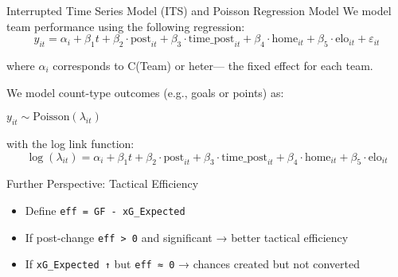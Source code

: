 \documentclass[
  ignorenonframetext,
]{beamer}
\providecommand{\tightlist}{%
  \setlength{\itemsep}{0pt}\setlength{\parskip}{0pt}}\usepackage{longtable,booktabs,array}
\begin{document}
\begin{frame}{Interrupted Time Series Model (ITS) and Poisson Regression
Model}
\label{interrupted-time-series-model-its-and-poisson-regression-model}
We model team performance using the following regression: \[
y_{it} = \alpha_i + \beta_1 t + \beta_2 \cdot \text{post}_{it} + \beta_3 \cdot \text{time\_post}_{it} + \beta_4 \cdot \text{home}_{it} + \beta_5 \cdot \text{elo}_{it} + \varepsilon_{it}
\]

where \(\alpha_i\) corresponds to C(Team) or heter--- the fixed effect
for each team.

We model count-type outcomes (e.g., goals or points) as:

\(y_{it} \sim \text{Poisson}(\lambda_{it})\)

with the log link function: \[
\log(\lambda_{it}) = \alpha_i + \beta_1 t + \beta_2 \cdot \text{post}_{it} + \beta_3 \cdot \text{time\_post}_{it} + \beta_4 \cdot \text{home}_{it} + \beta_5 \cdot \text{elo}_{it}
\]
\end{frame}

\begin{frame}[fragile]{Further Perspective: Tactical Efficiency}
\label{further-perspective-tactical-efficiency}
\begin{itemize}
\tightlist
\item
  Define \texttt{eff\ =\ GF\ -\ xG\_Expected}
\item
  If post-change \texttt{eff\ \textgreater{}\ 0} and significant →
  better tactical efficiency
\item
  If \texttt{xG\_Expected\ ↑} but \texttt{eff\ ≈\ 0} → chances created
  but not converted
\end{itemize}
\end{frame}
\end{document}
